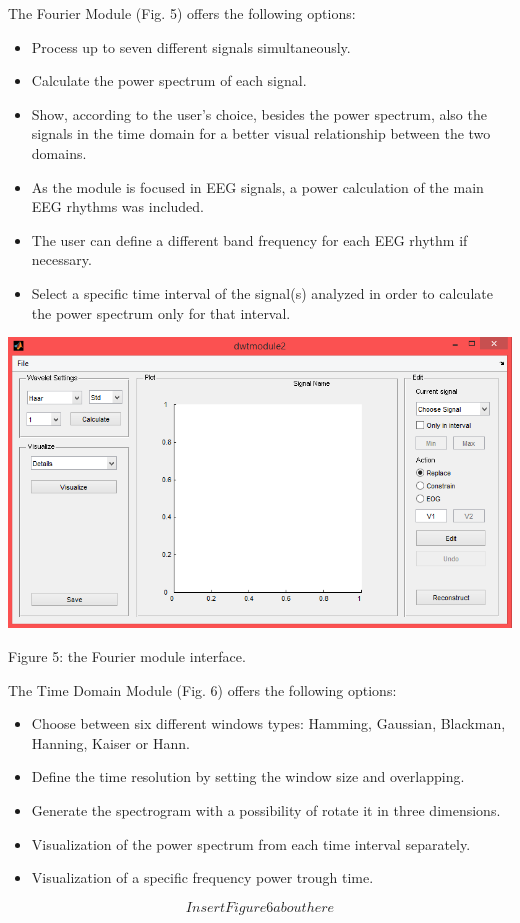 \documentclass[12pt, a4paper]{article}
\begin{document}
The Fourier Module (Fig. 5) offers the following options:
\begin{itemize}
\item Process up to seven different signals simultaneously.
\item Calculate the power spectrum of each signal. 
\item Show, according to the user’s choice, besides the power spectrum, also the signals in the time domain for a better visual relationship between the two domains. 
\item As the module is focused in EEG signals, a power calculation of the main EEG rhythms was included.
\item The user can define a different band frequency for each EEG rhythm if necessary.
\item Select a specific time interval of the signal(s) analyzed in order to calculate the power spectrum only for that interval.
\end{itemize}
\begin{center}
\includegraphics[width=15cm]{dwt2.png}

Figure 5: the Fourier module interface.
\end{center}

The Time Domain Module (Fig. 6) offers the following options:
\begin{itemize}
\item Choose between six different windows types: Hamming, Gaussian, Blackman, Hanning, Kaiser or Hann.
\item Define the time resolution by setting the window size and overlapping. 
\item Generate the spectrogram with a possibility of rotate it in three dimensions. 
\item Visualization of the power spectrum from each time interval separately.
\item Visualization of a specific frequency power trough time.
\end{itemize}
$$Insert Figure 6 about here$$
\end{document}
